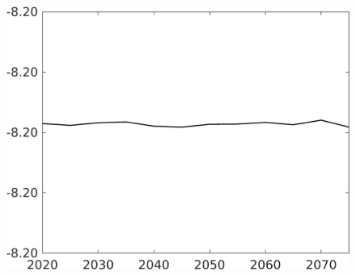 \documentclass[12pt]{article}
\begin{document}
\begin{figure}[h!!]
\begin{minipage}[]{0.32\textwidth}
	\end{minipage}	
	\begin{minipage}[]{0.32\textwidth}
		\includegraphics[width=1\textwidth]{../../codding_model/own_basedOnFried/optimalPol_010922_revision/figures/all_13Sept22/CompTaul_LFBAUPer_Reg0_Ln_spillover0_nsk1_xgr0_knspil0_sep1_countec0_GovRev0_etaa0.79.png}
	\end{minipage}	
\end{figure}
\clearpage
\newpage
\end{document}
